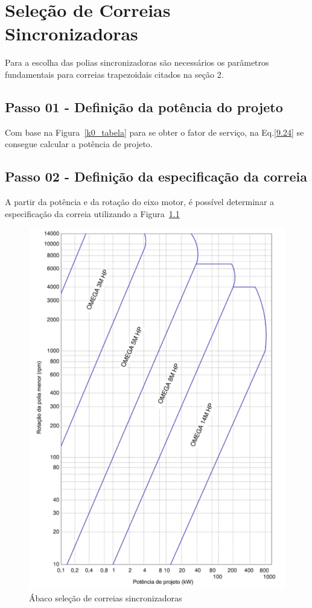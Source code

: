 \chapter{Seleção de Correias Sincronizadoras}

Para a escolha das polias sincronizadoras são necessários os parâmetros fundamentais para correias trapezoidais citados na seção 2.

\section{Passo 01 - Definição da potência do projeto}

Com base na Figura~\ref{k0_tabela} para se obter o fator de serviço, na Eq.\eqref{9.24} se consegue calcular a potência de projeto.


\section{Passo 02 - Definição da especificação da correia}

A partir da potência e da rotação do eixo motor, é possível determinar a especificação da correia utilizando a Figura~\ref{abaco_sinc}

\begin{figure}[h]
	\centering
	\caption{Ábaco seleção de correias sincronizadoras}
    \label{abaco_sinc}
	\includegraphics[scale=0.5]{Imagens/abaco_sinc.png}
\end{figure}

